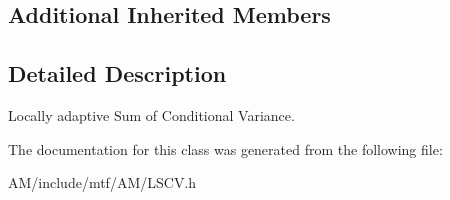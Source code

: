 \subsection*{Additional Inherited Members}


\subsection{Detailed Description}
Locally adaptive Sum of Conditional Variance. 

The documentation for this class was generated from the following file\-:\begin{DoxyCompactItemize}
\item 
A\-M/include/mtf/\-A\-M/L\-S\-C\-V.\-h\end{DoxyCompactItemize}
